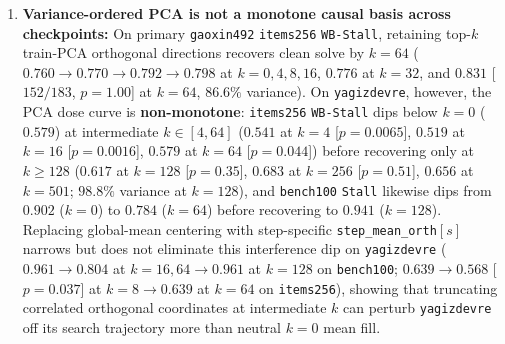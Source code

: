 \documentclass[10pt,letterpaper]{article}
\begin{document}
\begin{enumerate}[topsep=3pt,itemsep=2pt]
  \item \textbf{Variance-ordered PCA is not a monotone causal basis across checkpoints:} On primary \texttt{gaoxin492} \texttt{items256} \texttt{WB-Stall}, retaining top-$k$ train-PCA orthogonal directions recovers clean solve by $k=64$ ($0.760 \to 0.770 \to 0.792 \to 0.798$ at $k=0,4,8,16$, $0.776$ at $k=32$, and $\mathbf{0.831}$ [$152/183$, $p=1.00$] at $k=64$, $86.6\%$ variance). On \texttt{yagizdevre}, however, the PCA dose curve is \textbf{non-monotone}: \texttt{items256} \texttt{WB-Stall} dips below $k=0$ ($0.579$) at intermediate $k \in [4, 64]$ ($0.541$ at $k=4$ [$p=0.0065$], $0.519$ at $k=16$ [$p=0.0016$], $0.579$ at $k=64$ [$p=0.044$]) before recovering only at $k \ge 128$ ($0.617$ at $k=128$ [$p=0.35$], $0.683$ at $k=256$ [$p=0.51$], $0.656$ at $k=501$; $98.8\%$ variance at $k=128$), and \texttt{bench100} \texttt{Stall} likewise dips from $0.902$ ($k=0$) to $0.784$ ($k=64$) before recovering to $0.941$ ($k=128$). Replacing global-mean centering with step-specific \texttt{step\_mean\_orth}$[s]$ narrows but does not eliminate this interference dip on \texttt{yagizdevre} ($0.961 \to 0.804$ at $k=16,64 \to 0.961$ at $k=128$ on \texttt{bench100}; $0.639 \to 0.568$ [$p=0.037$] at $k=8 \to 0.639$ at $k=64$ on \texttt{items256}), showing that truncating correlated orthogonal coordinates at intermediate $k$ can perturb \texttt{yagizdevre} off its search trajectory more than neutral $k=0$ mean fill.

\end{enumerate}
\end{document}
